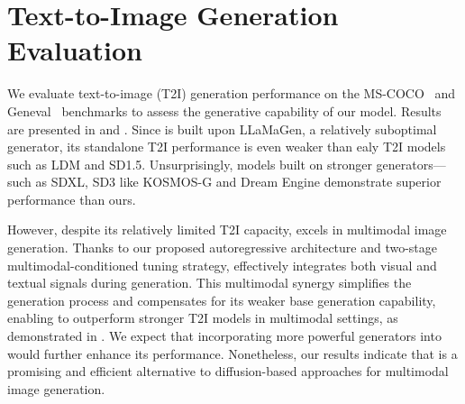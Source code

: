 \section{Text-to-Image Generation Evaluation}

We evaluate text-to-image (T2I) generation performance on the MS-COCO~\citep{lin2014mscoco} and Geneval~\citep{2024Geneval} benchmarks to assess the generative capability of our model. Results are presented in  and .
Since \model is built upon LLaMaGen, a relatively suboptimal generator, its standalone T2I performance is even weaker than ealy T2I models such as LDM and SD1.5. Unsurprisingly, models built on stronger generators—such as SDXL, SD3 like KOSMOS-G and Dream Engine demonstrate superior performance than ours.

However, despite its relatively limited T2I capacity, \model excels in multimodal image generation. Thanks to our proposed autoregressive architecture and two-stage multimodal-conditioned tuning strategy, \model effectively integrates both visual and textual signals during generation. This multimodal synergy simplifies the generation process and compensates for its weaker base generation capability, enabling \model to outperform stronger T2I models in multimodal settings, as demonstrated in . We expect that incorporating more powerful generators into \model would further enhance its performance. Nonetheless, our results indicate that \model is a promising and efficient alternative to diffusion-based approaches for multimodal image generation.


